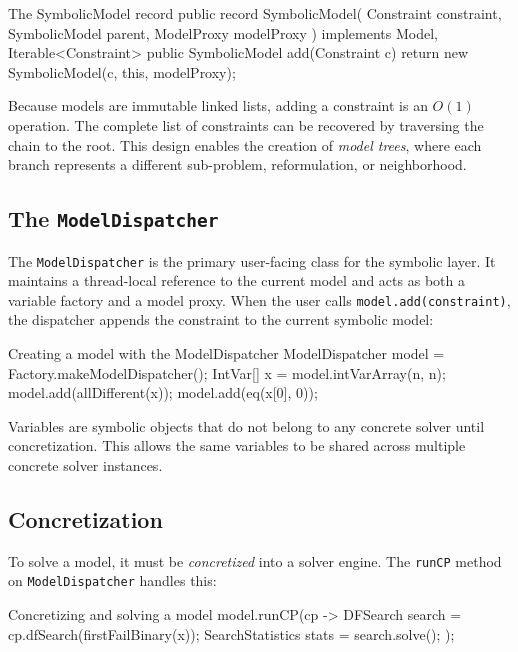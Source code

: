 \documentclass[11pt, a4paper]{scrartcl}
\begin{document}
\begin{codebox}{The SymbolicModel record}
public record SymbolicModel(
    Constraint constraint,
    SymbolicModel parent,
    ModelProxy modelProxy
) implements Model, Iterable<Constraint> {
    public SymbolicModel add(Constraint c) {
        return new SymbolicModel(c, this, modelProxy);
    }
}
\end{codebox}

Because models are immutable linked lists, adding a constraint is an $O(1)$ operation. The complete list of constraints can be recovered by traversing the chain to the root. This design enables the creation of \emph{model trees}, where each branch represents a different sub-problem, reformulation, or neighborhood.

\subsection{The \texttt{ModelDispatcher}}

The \texttt{ModelDispatcher} is the primary user-facing class for the symbolic layer. It maintains a thread-local reference to the current model and acts as both a variable factory and a model proxy. When the user calls \texttt{model.add(constraint)}, the dispatcher appends the constraint to the current symbolic model:

\begin{codebox}{Creating a model with the ModelDispatcher}
ModelDispatcher model = Factory.makeModelDispatcher();
IntVar[] x = model.intVarArray(n, n);
model.add(allDifferent(x));
model.add(eq(x[0], 0));
\end{codebox}

Variables are symbolic objects that do not belong to any concrete solver until concretization. This allows the same variables to be shared across multiple concrete solver instances.

\subsection{Concretization}

To solve a model, it must be \emph{concretized} into a solver engine. The \texttt{runCP} method on \texttt{ModelDispatcher} handles this:

\begin{codebox}{Concretizing and solving a model}
model.runCP(cp -> {
    DFSearch search = cp.dfSearch(firstFailBinary(x));
    SearchStatistics stats = search.solve();
});
\end{codebox}
\end{document}
